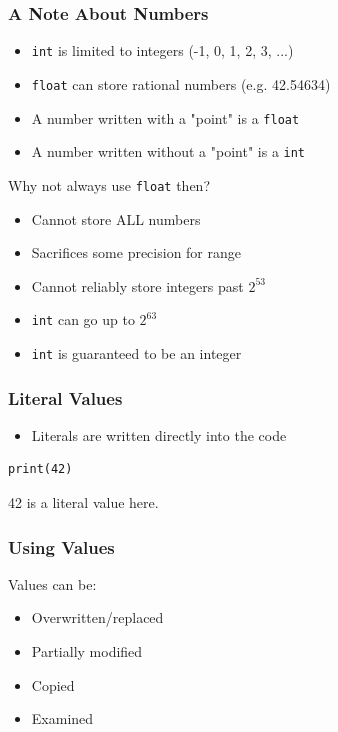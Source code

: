 \documentclass{beamer}
\newenvironment{xframe}[2][]
{
    \begin{frame}[fragile,environment=xframe,#1]
    \frametitle{#2}
}{
    \end{frame}
}
\begin{document}
\begin{xframe}{A Note About Numbers}
    \begin{itemize}
        \item \texttt{int} is limited to integers (-1, 0, 1, 2, 3, ...)
        \item \texttt{float} can store rational numbers (e.g. 42.54634)
        \item A number written with a "point" is a \texttt{float}
        \item A number written without a "point" is a \texttt{int}
    \end{itemize}

    \pause
    \bigskip

    Why not always use \texttt{float} then?
    \begin{itemize}
        \item Cannot store ALL numbers
        \item Sacrifices some precision for range
        \item Cannot reliably store integers past $2^{53}$
        \pause
        \item \texttt{int} can go up to $2^{63}$
        \item \texttt{int} is guaranteed to be an integer
    \end{itemize}

\end{xframe}

\begin{xframe}{Literal Values}
    \begin{itemize}
        \item Literals are written directly into the code
    \end{itemize}

    \begin{verbatim}
print(42)
    \end{verbatim}

    42 is a literal value here.

\end{xframe}

\begin{xframe}{Using Values}
    Values can be:
    \begin{itemize}
        \item Overwritten/replaced
        \item Partially modified
        \item Copied
        \item Examined
    \end{itemize}

\end{xframe}
\end{document}
